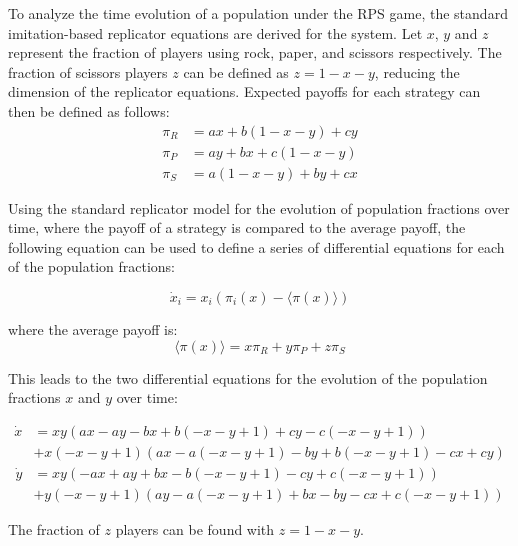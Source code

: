 \documentclass[%
 reprint,
 amsmath,amssymb,
 aps,
]{revtex4-2}
\begin{document}
To analyze the time evolution of a population under the RPS game, 
the standard imitation-based replicator equations are derived for the system.
Let $x$, $y$ and $z$ represent the fraction of players using rock, paper, and scissors
respectively. The fraction of scissors players $z$ can be defined as $z = 1 - x - y$, 
reducing the dimension of the replicator equations.
Expected payoffs for each strategy can then be defined as follows:
\begin{align}
   \pi_R &= a x + b \left(1- x - y\right) + c y \nonumber \\
   \pi_P &= a y + b x + c \left(1- x - y\right) \nonumber\\
   \pi_S &= a \left(1-x-y\right) + b y + c x \nonumber
\end{align}

Using the standard replicator model for the evolution of population fractions over time, where
the payoff of a strategy is compared to the average payoff, the 
following equation \cite{evolution_pop_dynamics} can be used to define a series of differential equations for 
each of the population fractions:

\begin{equation} \label{eq:standard_replicator_dynamics}
\dot x_i = x_i(\pi_i(x) - \langle \pi(x) \rangle)
\end{equation}

where the average payoff is:
\begin{equation}
\langle \pi(x) \rangle = x \pi_R + y \pi_P + z \pi_S
\end{equation}


This leads to the two differential equations for the evolution of the population fractions $x$ and $y$ 
over time:

\begin{widetext}
\begin{equation}
    \begin{split}
        \dot{x} &= x y \left(a x - a y - b x + b \left(-x - y + 1\right) + c y 
        - c \left(-x - y + 1\right)\right) \\
        & + x \left(-x - y + 1\right) \left(a x - a \left(-x - y + 1\right)
        - b y + b \left(-x - y + 1\right) - c x + c y\right)
    \end{split}
\end{equation}
\begin{equation}
    \begin{split}
        \dot{y} &= x y \left(- a x + a y + b x - b \left(- x - y + 1\right) - c y 
        + c \left(- x - y + 1\right)\right) \\
        & + y \left(- x - y + 1\right) \left(a y - a \left(- x - y + 1\right)
        + b x - b y - c x + c \left(- x - y + 1\right)\right)
    \end{split}
\end{equation}
\end{widetext}
The fraction of $z$ players can be found with $z = 1-x-y$.
\end{document}
